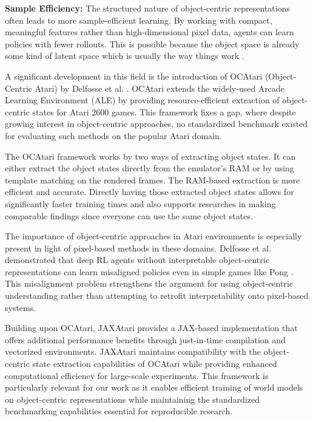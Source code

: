 \documentclass[
	english,
	ruledheaders=section,
	class=report,
	thesis={type=master},
	accentcolor=9c,
	custommargins=true,
	marginpar=false,
	parskip=half-,
	fontsize=11pt,
]{tudapub}
\begin{document}
\textbf{Sample Efficiency:} The structured nature of object-centric representations often leads to more sample-efficient learning. By working with compact, meaningful features rather than high-dimensional
pixel data, agents can learn policies with fewer rollouts. This is possible because the object space is already some kind of latent space which is usually the way things work \cite{locatello2020object}.

A significant development in this field is the introduction of OCAtari
(Object-Centric Atari) by Delfosse et al. \cite{delfosse2023ocatari}. OCAtari
extends the widely-used Arcade Learning Environment (ALE) by providing
resource-efficient extraction of object-centric states for Atari 2600 games.
This framework fixes a gap, where despite growing interest in object-centric
approaches, no standardized benchmark existed for evaluating such methods on
the popular Atari domain.

The OCAtari framework works by two ways of extracting object states. It can
either extract the object states directly from the emulator's RAM or by using
template matching on the rendered frames. The RAM-based extraction is more
efficient and accurate. Directly having those extracted object states allows
for significantly faster training times and also supports researches in making
comparable findings since everyone can use the same object states.

The importance of object-centric approaches in Atari environments is especially
present in light of pixel-based methods in these domains. Delfosse et al.
demonstrated that deep RL agents without interpretable object-centric
representations can learn misaligned policies even in simple games like Pong
\cite{delfosse2023ocatari}. This misalignment problem strengthens the argument
for using object-centric understanding rather than attempting to retrofit
interpretability onto pixel-based systems.

Building upon OCAtari, JAXAtari \cite{machado2023revisiting} provides a
JAX-based implementation that offers additional performance benefits through
just-in-time compilation and vectorized environments. JAXAtari maintains
compatibility with the object-centric state extraction capabilities of OCAtari
while providing enhanced computational efficiency for large-scale experiments.
This framework is particularly relevant for our work as it enables efficient
training of world models on object-centric representations while maintaining
the standardized benchmarking capabilities essential for reproducible research.
\end{document}
